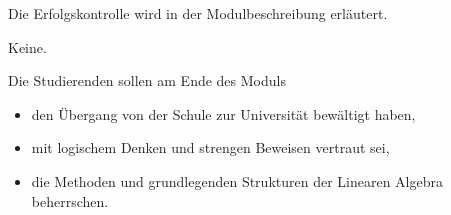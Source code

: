 \begin{course}

\setdoclanguagegerman
{}



\coursehead


\label{cour_6283.dp_997}


\begin{styleenv}
\begin{assessment}
Die Erfolgskontrolle wird in der Modulbeschreibung erläutert.


\end{assessment}

\begin{conditions}Keine.\end{conditions}


\end{styleenv}

\begin{learningoutcomes}
Die Studierenden sollen am Ende des Moduls

 \begin{itemize}\item den Übergang von der Schule zur Universität bewältigt haben,  \item mit logischem Denken und strengen Beweisen vertraut sei,   \item die Methoden und grundlegenden Strukturen der Linearen Algebra beherrschen.  \end{itemize}
\end{learningoutcomes}


\end{course}
